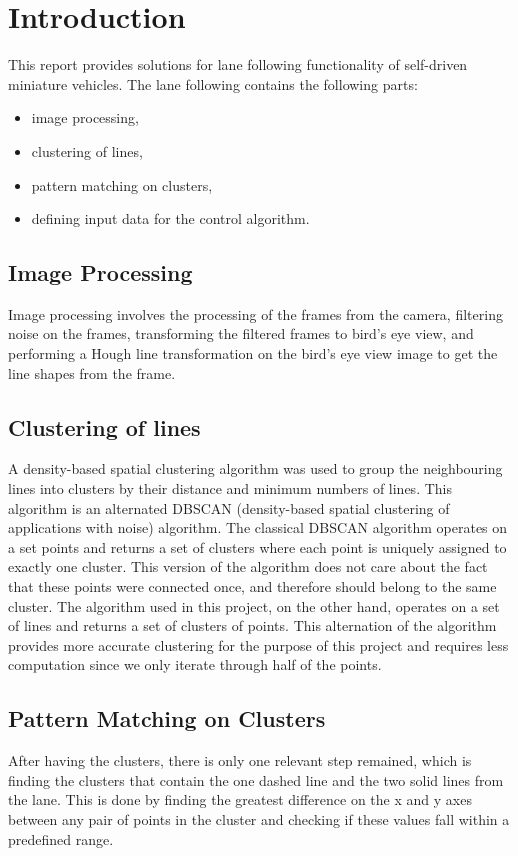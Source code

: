 \documentclass[Report.tex]{subfiles}
\begin{document}
\chapter{Introduction}
This report provides solutions for lane following functionality of
self-driven miniature vehicles. The lane following contains the following parts:
\begin{itemize}
  \item image processing,
  \item clustering of lines,
  \item pattern matching on clusters,
  \item defining input data for the control algorithm.
\end{itemize}

\section{Image Processing} %
\label{sec:Image Processing}
Image processing involves the processing of the frames from the camera,
filtering noise on the frames, transforming the filtered frames to bird's
eye view, and performing a Hough line transformation on the bird's eye
view image to get the line shapes from the frame.

\section{Clustering of lines} %
\label{sec:Clustering of lines}
A density-based spatial clustering algorithm was used to group the
neighbouring lines into clusters by their distance and minimum numbers of
lines. This algorithm is an alternated DBSCAN (density-based spatial clustering of
applications with noise)\cite{www:dbscan} algorithm.
The classical DBSCAN algorithm operates on a set points and returns a set of
clusters where each point is uniquely assigned to exactly one cluster. This
version of the algorithm does not care about the fact that these points were
connected once, and therefore should belong to the same cluster. The
algorithm used in this project, on the other hand, operates on a set of lines
and returns a set of clusters of points. This alternation of the algorithm
provides more accurate clustering for the purpose of this project and requires
less computation since we only iterate through half of the points.

\section{Pattern Matching on Clusters} %
After having the clusters, there is only one relevant step remained, which is
finding the clusters that contain the one dashed line and the two solid lines
from the lane. This is done by finding the greatest difference on the x and y
axes between any pair of points in the cluster and checking if these values
fall within a predefined range.
\end{document}

